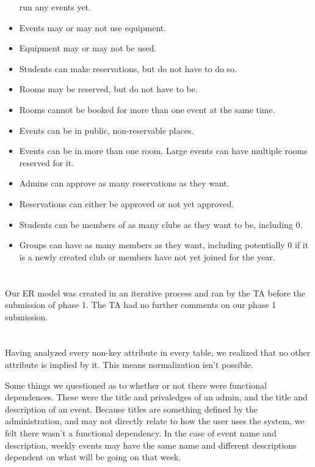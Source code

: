 \documentclass{article}
\begin{document}
\begin{itemize}
run any events yet. 
\item Events may or may not use equipment.
\item Equipment may or may not be used. 
\item  Students can make reservations, but do not have to do so.
\item Rooms may be reserved, but do not have to be.
\item Rooms cannot be booked for more than one event at the same time. 
\item Events can be in public, non-reservable places.
\item Events can be in more than one room. Large events can have multiple rooms
reserved for it.
\item Admins can approve as many reservations as they want.
\item Reservations can either be approved or not yet approved.
\item Students can be members of as many clubs as they want to be, including 0.
\item Groups can have as many members as they want, including potentially 0 if
it is a newly created club or members have not yet joined for the year.
\end{itemize}



\section{}
Our ER model was created in an iterative process and ran by the TA before
the submission of phase 1. The TA had no further comments on our phase 1
submission. 

\section{}


\section{}
Having analyzed every non-key attribute in every table, we realized that no
other attribute is implied by it. This means normalization isn't possible. 

Some things we questioned as to whether or not there were functional
dependences. These were the title and privaledges of an admin, and the title and
description of an event. Because titles are something defined by the
administration, and may not directly relate to how the user uses the system, we
felt there wasn't a functional dependency. In the case of event name and
description, weekly events may have the same name and different descriptions
dependent on what will be going on that week.
\end{document}

